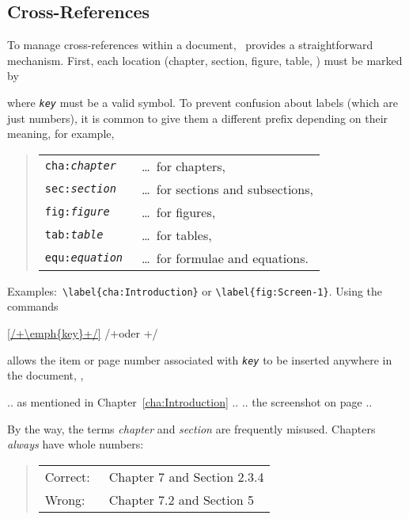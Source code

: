 \subsection{Cross-References}
\label{sec:cross-references}

To manage cross-references within a document, \latex\ provides a straightforward
mechanism. First, each location (chapter, section, figure, table, \etc) must be
marked by
%
\begin{LaTeXCode}[numbers=none]
\label{/+\emph{key}+/}
\end{LaTeXCode}
%
where \texttt{\em key} must be a valid \latex symbol.
To prevent confusion about labels (which are just numbers), it is common to give
them a different prefix depending on their meaning, for example,
%
\begin{quote}
    \begin{tabular}{ll}
        \verb!cha:!\texttt{\em chapter} & \ \ldots\ for chapters, \\
        \verb!sec:!\texttt{\em section} & \ \ldots\ for sections and
        subsections, \\
        \verb!fig:!\texttt{\em figure} & \ \ldots\ for figures, \\
        \verb!tab:!\texttt{\em table} & \ \ldots\ for tables, \\
        \verb!equ:!\texttt{\em equation} & \ \ldots\ for formulae and equations.
    \end{tabular}
\end{quote}
%
\noindent
Examples:\ \verb!\label{cha:Introduction}! or \verb!\label{fig:Screen-1}!.
Using the commands
%
\begin{LaTeXCode}[numbers=none]
\ref{/+\emph{key}+/} /+\quad oder \quad+/ 
\end{LaTeXCode}
%
allows the item or page number associated with \texttt{\emph{key}} to be
inserted anywhere in the document, \eg,
%
\begin{LaTeXCode}[numbers=none]
.. as mentioned in Chapter~\ref{cha:Introduction} ..
.. the screenshot on page \pageref{fig:Screen-1} ..
\end{LaTeXCode}
%
By the way, the terms \emph{chapter} and \emph{section} are frequently misused.
Chapters \emph{always} have whole numbers:
%
\begin{quote}
    \begin{tabular}{ll}
        \textrm{Correct:\ } & Chapter 7 and Section 2.3.4 \\
        \textrm{Wrong:\ } & Chapter 7.2 and Section 5
    \end{tabular}
\end{quote}
